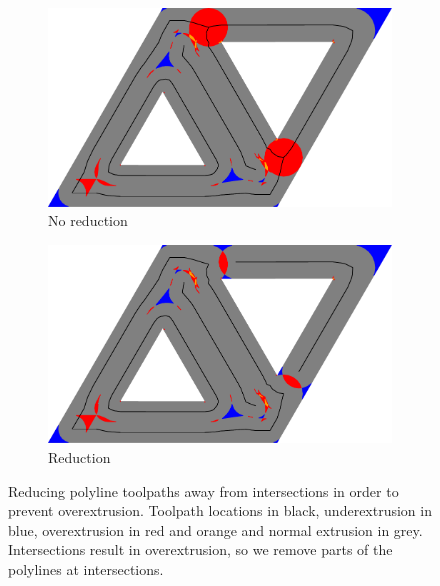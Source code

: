 \begin{figure}
\centering
\setlength{\figwidth}{\columnwidth}
\begin{subfigure}{0.45\figwidth}\centering
\includegraphics[width=\columnwidth]{sources/method/polyline_reduction_unreduced.pdf}
\caption{No reduction}
\end{subfigure}
\begin{subfigure}{0.45\figwidth}\centering
\includegraphics[width=\columnwidth]{sources/method/polyline_reduction_reduced.pdf}
\caption{Reduction}
\end{subfigure}
\caption{
Reducing polyline toolpaths away from intersections in order to prevent overextrusion.
Toolpath locations in black, underextrusion in blue, overextrusion in red and orange and normal extrusion in grey.
Intersections result in overextrusion, so we remove parts of the polylines at intersections.
}
\label{polyline_reduction}
\end{figure}



























































